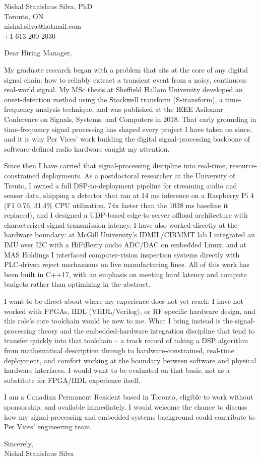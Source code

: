 \documentclass[11pt]{article}
\begin{document}
\pagestyle{empty}

\begin{flushright}
Nishal Stanislaus Silva, PhD \\
Toronto, ON \\
nishal.silva@hotmail.com \\
+1 613 200 2030
\end{flushright}

Dear Hiring Manager,

My graduate research began with a problem that sits at the core of any digital signal chain: how to reliably extract a transient event from a noisy, continuous real-world signal. My MSc thesis at Sheffield Hallam University developed an onset-detection method using the Stockwell transform (S-transform), a time-frequency analysis technique, and was published at the IEEE Asilomar Conference on Signals, Systems, and Computers in 2018. That early grounding in time-frequency signal processing has shaped every project I have taken on since, and it is why Per Vices' work building the digital signal-processing backbone of software-defined radio hardware caught my attention.

Since then I have carried that signal-processing discipline into real-time, resource-constrained deployments. As a postdoctoral researcher at the University of Trento, I owned a full DSP-to-deployment pipeline for streaming audio and sensor data, shipping a detector that ran at 14 ms inference on a Raspberry Pi 4 (F1 0.76, 31.4\% CPU utilization, 74x faster than the 1038 ms baseline it replaced), and I designed a UDP-based edge-to-server offload architecture with characterized signal-transmission latency. I have also worked directly at the hardware boundary: at McGill University's IDMIL/CIRMMT lab I integrated an IMU over I2C with a HiFiBerry audio ADC/DAC on embedded Linux, and at MAS Holdings I interfaced computer-vision inspection systems directly with PLC-driven reject mechanisms on live manufacturing lines. All of this work has been built in C++17, with an emphasis on meeting hard latency and compute budgets rather than optimizing in the abstract.

I want to be direct about where my experience does not yet reach: I have not worked with FPGAs, HDL (VHDL/Verilog), or RF-specific hardware design, and this role's core toolchain would be new to me. What I bring instead is the signal-processing theory and the embedded-hardware integration discipline that tend to transfer quickly into that toolchain -- a track record of taking a DSP algorithm from mathematical description through to hardware-constrained, real-time deployment, and comfort working at the boundary between software and physical hardware interfaces. I would want to be evaluated on that basis, not as a substitute for FPGA/HDL experience itself.

I am a Canadian Permanent Resident based in Toronto, eligible to work without sponsorship, and available immediately. I would welcome the chance to discuss how my signal-processing and embedded-systems background could contribute to Per Vices' engineering team.

Sincerely, \\
Nishal Stanislaus Silva
\end{document}
